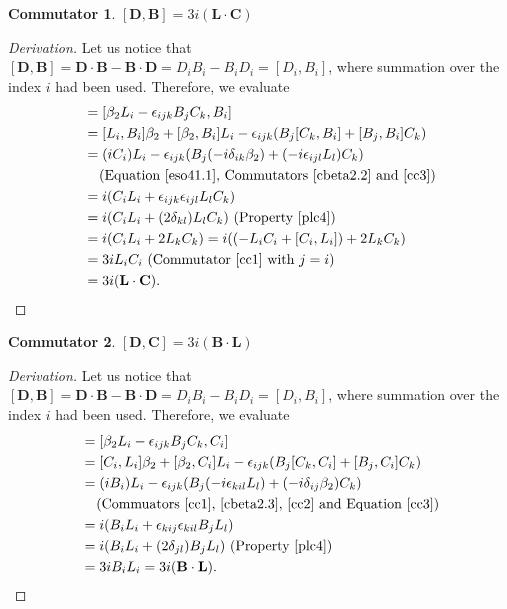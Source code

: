 \documentclass[12pt,a4paper]{report}
\theoremstyle{definition}
\newtheorem{commutator}{Commutator}[section]
\newenvironment{derivation}
  {\renewcommand\qedsymbol{$\square$}\begin{proof}[Derivation]}
  {\end{proof}}
\theoremstyle{remark}
\theoremstyle{remark}
\begin{document}
\begin{appendices}
\begin{commutator}\label{cd1}
$[\textbf{D},\textbf{B}]=3i(\textbf{L}\cdot\textbf{C})$
\end{commutator}
\begin{derivation} Let us notice that $[\textbf{D},\textbf{B}]=\textbf{D}\cdot\textbf{B}-\textbf{B}\cdot\textbf{D}=D_iB_i-B_iD_i=[D_i,B_i]$, where summation over the index $i$ had been used. Therefore, we evaluate
\begin{align*}
[D_i,B_i]&=[\beta_2L_i-\epsilon_{ijk}B_jC_k,B_i] \\
&=[L_i,B_i]\beta_2+[\beta_2,B_i]L_i-\epsilon_{ijk}(B_j[C_k,B_i]+[B_j,B_i]C_k) \\
&= (iC_i)L_i-\epsilon_{ijk}(B_j(-i\delta_{ik}\beta_2)+(-i\epsilon_{ijl}L_l)C_k) \\
&\phantom{=}\text{ (Equation~\ref{eso41.1}, Commutators~\ref{cbeta2.2} and~\ref{cc3})}\\
&=i(C_iL_i+\epsilon_{ijk}\epsilon_{ijl}L_lC_k)\\
&=i(C_iL_i+(2\delta_{kl})L_lC_k) \text{ (Property~\ref{plc4})}\\
&=i(C_iL_i+2L_kC_k)=i((-L_iC_i+[C_i,L_i])+2L_kC_k)\\
&=3iL_iC_i \text{ (Commutator~\ref{cc1} with }j=i)\\
&=3i(\textbf{L}\cdot\textbf{C}).
\end{align*}
\end{derivation}

\begin{commutator}\label{cd2}
$[\textbf{D},\textbf{C}]=3i(\textbf{B}\cdot\textbf{L})$
\end{commutator}
\begin{derivation} Let us notice that $[\textbf{D},\textbf{B}]=\textbf{D}\cdot\textbf{B}-\textbf{B}\cdot\textbf{D}=D_iB_i-B_iD_i=[D_i,B_i]$, where summation over the index $i$ had been used. Therefore, we evaluate
\begin{align*}
[D_i,C_i]&=[\beta_2L_i-\epsilon_{ijk}B_jC_k,C_i] \\
&= [C_i,L_i]\beta_2+[\beta_2,C_i]L_i-\epsilon_{ijk}(B_j[C_k,C_i]+[B_j,C_i]C_k) \\
&= (iB_i)L_i-\epsilon_{ijk}(B_j(-i\epsilon_{kil}L_l)+(-i\delta_{ij}\beta_2)C_k) \\
&\phantom{=}\text{ (Commuators~\ref{cc1},~\ref{cbeta2.3},~\ref{cc2} and Equation~\ref{cc3})}\\
&=i(B_iL_i+\epsilon_{kij}\epsilon_{kil}B_jL_l)\\
&=i(B_iL_i+(2\delta_{jl})B_jL_l) \text{ (Property~\ref{plc4})}\\
&=3iB_iL_i=3i(\textbf{B}\cdot\textbf{L}).
\end{align*}
\end{derivation}


\end{appendices}
\end{document}
